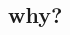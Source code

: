\documentclass[14pt , pdftex , hyperref, handout]{beamer} %
\newenvironment{f}[1]
{
  \begin{frame}[fragile,environment=f] 
    \frametitle{ \normalsize \bf{#1}} 
    \vspace{-.4cm} 
    \setbeamercovered{transparent=10} 
    \begin{enumerate}[<+->][$\diamond$]
}{
    \end{enumerate} 
    \setbeamercovered{invisible} 
  \end{frame}
}
\renewcommand{\i}{
\item[$\bullet$] \hspace{-.14in}
}
\newcommand{\s}{
 \item[$\circ$] \hspace{-.14in}
}
\newcommand{\p}{
 \\ \pause
}
\begin{document}
\begin{spacing}{1.2}







\section{why?}


\end{spacing}
\end{document}
